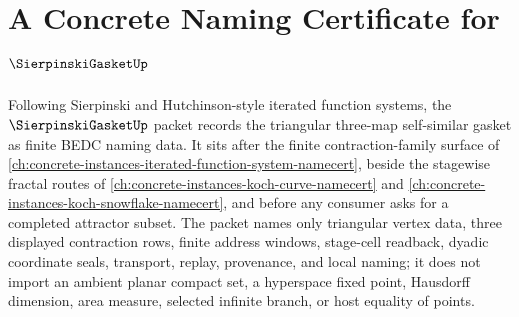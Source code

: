 \chapter{A Concrete Naming Certificate for $\SierpinskiGasketUp$}
\label{ch:concrete-instances-sierpinski-gasket-namecert}

Following Sierpinski and Hutchinson-style iterated function systems, the $\SierpinskiGasketUp$ packet records the triangular three-map self-similar gasket as finite BEDC naming data. It sits after the finite contraction-family surface of \autoref{ch:concrete-instances-iterated-function-system-namecert}, beside the stagewise fractal routes of \autoref{ch:concrete-instances-koch-curve-namecert} and \autoref{ch:concrete-instances-koch-snowflake-namecert}, and before any consumer asks for a completed attractor subset. The packet names only triangular vertex data, three displayed contraction rows, finite address windows, stage-cell readback, dyadic coordinate seals, transport, replay, provenance, and local naming; it does not import an ambient planar compact set, a hyperspace fixed point, Hausdorff dimension, area measure, selected infinite branch, or host equality of points.

